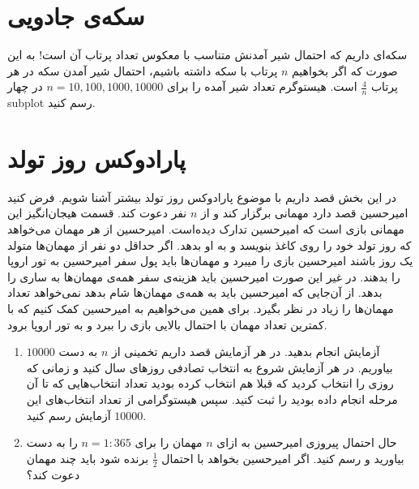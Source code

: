 \documentclass[a4paper]{article}
\begin{document}
\section{
سکه‌ی جادویی
}
سکه‌ای داریم که احتمال شیر آمدنش متناسب با معکوس تعداد پرتاب آن است! به این صورت که اگر بخواهیم
 $ n $
 پرتاب با سکه داشته باشیم، احتمال شیر آمدن سکه در هر پرتاب 
  $ \frac{4}{n} $
 است. هیستوگرم تعداد شیر آمده را برای 
 $ n = 10,100,1000,10000 $
 در چهار subplot رسم کنید. 


\section{
پارادوکس روز تولد
}
در این بخش قصد داریم با موضوع پارادوکس روز تولد بیشتر آشنا شویم. فرض کنید امیرحسین قصد دارد مهمانی برگزار کند و از $ n $ نفر دعوت کند. قسمت هیجان‌انگیز این مهمانی بازی‌ است که امیرحسین تدارک دیده‌است. امیرحسین از هر مهمان می‌خواهد که روز تولد خود را روی کاغذ بنویسد و به او بدهد. اگر حداقل دو نفر از مهمان‌‌ها متولد یک روز باشند امیرحسین  بازی را میبرد و مهمان‌ها باید پول سفر ‌امیرحسین به تور اروپا را بدهند. در غیر این صورت امیرحسین باید هزینه‌ی سفر‌ همه‌ی مهمان‌ها به ساری را بدهد. از آن‌جایی که امیرحسین باید به همه‌ی مهمان‌ها شام بدهد نمی‌خواهد تعداد مهمان‌‌ها را زیاد در نظر بگیرد. برای همین می‌خواهیم به امیرحسین کمک کنیم که با کمترین تعداد مهمان با احتمال بالایی بازی را ببرد و به تور اروپا برود. 
\begin{enumerate}
	\item
$ 10000 $ آزمایش انجام بدهید. در هر آزمایش قصد داریم تخمینی از $ n $ به دست بیاوریم. در هر آزمایش شروع به انتخاب تصادفی روز‌های سال کنید و زمانی که روزی را انتخاب کردید که قبلا هم انتخاب کرده بودید تعداد انتخاب‌‌هایی که تا آن مرحله انجام داده بودید را ثبت کنید. سپس هیستوگرامی از تعداد انتخاب‌های این $ 10000 $  آزمایش رسم کنید. 
	\item
حال احتمال پیروزی امیرحسین به ازای $ n $ مهمان را برای
	$ n = 1:365 $ 
را به دست بیاورید و رسم کنید. اگر امیرحسین بخواهد با احتمال
 $  \frac{1}{2}$
 برنده شود باید چند مهمان دعوت کند؟
\end{enumerate}
\end{document}
